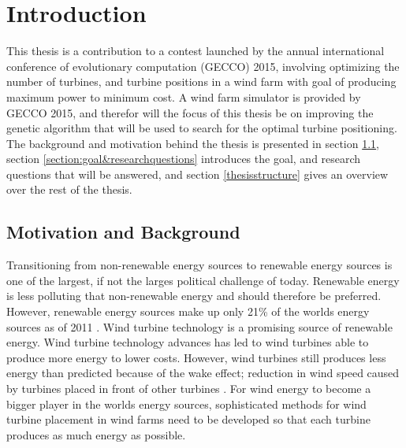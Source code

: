 \chapter{Introduction}\label{chapter:introduction}
This thesis is a contribution to a contest launched by the annual international conference of evolutionary computation (GECCO) 2015, involving optimizing the number of turbines, and turbine positions in a wind farm with goal of producing maximum power to minimum cost. A wind farm simulator is provided by GECCO 2015, and therefor will the focus of this thesis be on improving the genetic algorithm that will be used to search for the optimal turbine positioning. The background and motivation behind the thesis is presented in section \ref{section:motivation&background}, section \ref{section:goal&researchquestions} introduces the goal, and research questions that will be answered, and section \ref{thesisstructure} gives an overview over the rest of the thesis. 


\section{Motivation and Background}\label{section:motivation&background}
Transitioning from non-renewable energy sources to renewable energy sources is one of the largest, if not the larges political challenge of today. Renewable energy is less polluting that non-renewable energy and should therefore be preferred. However, renewable energy sources make up only 21\% of the worlds energy sources as of 2011 \citep{url1}. Wind turbine technology is a promising source of renewable energy. Wind turbine technology advances has led to wind turbines able to produce more energy to lower costs. However, wind turbines still produces less energy than predicted because of the wake effect; reduction in wind speed caused by turbines placed in front of other turbines \citep{Samorani}. For wind energy to become a bigger player in the worlds energy sources, sophisticated methods for wind turbine placement in wind farms need to be developed so that each turbine produces as much energy as possible. \\

